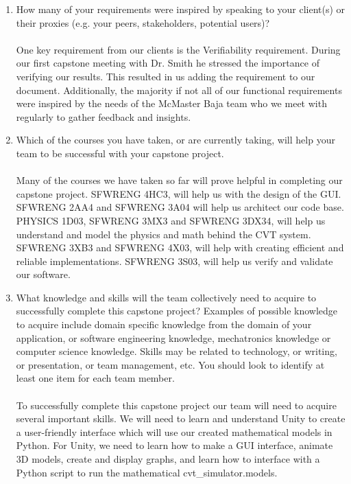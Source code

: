 \documentclass[12pt]{article}
\begin{document}
\begin{enumerate}
  We also reached out to our clients for clarifications, and they provided us with help and resources to better understand the topic. 
  As a result our team was more confident in deriving the mathematical models required for this project.   
  \item How many of your requirements were inspired by speaking to your
  client(s) or their proxies (e.g. your peers, stakeholders, potential users)?
  \\\\
  One key requirement from our clients is the Verifiability requirement.
  During our first capstone meeting with Dr. Smith he stressed the importance of verifying our results.
  This resulted  in us adding the requirement to our document.
  Additionally, the majority if not all of our functional requirements were inspired by the needs of the McMaster Baja team who we meet with regularly to gather feedback and insights.
  \item Which of the courses you have taken, or are currently taking, will help
  your team to be successful with your capstone project.
  \\\\
  Many of the courses we have taken so far will prove helpful in completing our capstone project.
  SFWRENG 4HC3, will help us with the design of the GUI.
  SFWRENG 2AA4 and SFWRENG 3A04 will help us architect our code base.
  PHYSICS 1D03, SFWRENG 3MX3 and SFWRENG 3DX34, will help us understand and model the physics and math behind the CVT system.
  SFWRENG 3XB3 and SFWRENG 4X03, will help with creating efficient and reliable implementations.
  SFWRENG 3S03, will help us verify and validate our software.
  \item What knowledge and skills will the team collectively need to acquire to
  successfully complete this capstone project?  Examples of possible knowledge
  to acquire include domain specific knowledge from the domain of your
  application, or software engineering knowledge, mechatronics knowledge or
  computer science knowledge.  Skills may be related to technology, or writing,
  or presentation, or team management, etc.  You should look to identify at
  least one item for each team member.
  \\\\
  To successfully complete this capstone project our team will need to acquire several important skills.
  We will need to learn and understand Unity to create a user-friendly interface which will use our created mathematical models in Python.
  For Unity, we need to learn how to make a GUI interface, animate 3D models, create and display graphs, and learn how to interface with a Python script to run the mathematical cvt_simulator.models.

\end{enumerate}
\end{document}
